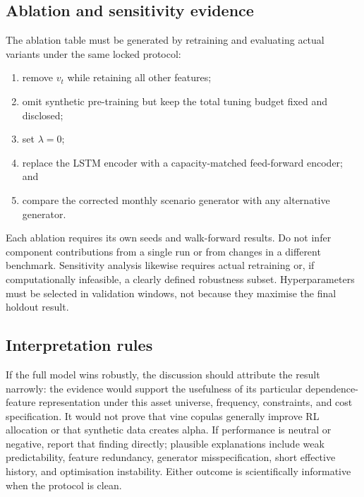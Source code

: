 \subsection{Ablation and sensitivity evidence}

The ablation table must be generated by retraining and evaluating actual variants under the same locked protocol:
\begin{enumerate}
\item remove $v_t$ while retaining all other features;
\item omit synthetic pre-training but keep the total tuning budget fixed and disclosed;
\item set $\lambda=0$;
\item replace the LSTM encoder with a capacity-matched feed-forward encoder; and
\item compare the corrected monthly scenario generator with any alternative generator.
\end{enumerate}
Each ablation requires its own seeds and walk-forward results. Do not infer component contributions from a single run or from changes in a different benchmark. Sensitivity analysis likewise requires actual retraining or, if computationally infeasible, a clearly defined robustness subset. Hyperparameters must be selected in validation windows, not because they maximise the final holdout result.

\subsection{Interpretation rules}

If the full model wins robustly, the discussion should attribute the result narrowly: the evidence would support the usefulness of its particular dependence-feature representation under this asset universe, frequency, constraints, and cost specification. It would not prove that vine copulas generally improve RL allocation or that synthetic data creates alpha. If performance is neutral or negative, report that finding directly; plausible explanations include weak predictability, feature redundancy, generator misspecification, short effective history, and optimisation instability. Either outcome is scientifically informative when the protocol is clean.
